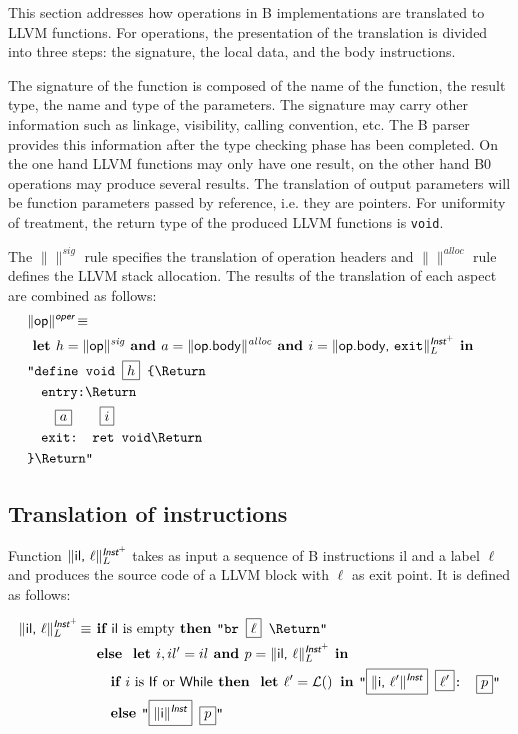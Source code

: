 \documentclass{llncs}
\newcommand{\trad}[2]{\ensuremath{\lVert \textsf{#1} \rVert^{\textit{#2}}}}
\newcommand{\nl}[0]{\text{\Return}}
\DeclareMathOperator{\isdef}{\equiv}
\DeclareMathOperator{\name}{\mathcal{L}()}
\newcommand{\llvm}[1]{\texttt{#1}}
\newcommand{\B}[1]{\textsf{#1}}
\newcommand{\ListOf}[1]{$\mbox{#1}^+$}
\newcommand{\IF}[0]{\textbf{ if }}
\newcommand{\ELSE}[0]{\textbf{ else }}
\newcommand{\THEN}[0]{\textbf{ then }}
\newcommand{\LET}[0]{\textbf{ let }}
\newcommand{\IN}[0]{\textbf{ in }}
\newcommand{\AND}[0]{\textbf{ and }}
\newcommand{\PH}[1]{\framebox{$#1$}}
\begin{document}
This section addresses how operations in B implementations are translated to
LLVM functions. For operations, the presentation of the translation
is divided into three steps: the signature, the local data, and the body
instructions.

The signature of the function is composed of the name of the function, the
result type, the name and type of the parameters. The signature may carry other
information such as linkage, visibility, calling convention, etc. The B parser
provides this information after the type checking phase has been completed.  On
the one hand LLVM functions may only have one result, on the other hand B0
operations may produce several results. The translation of output parameters
will be function parameters passed by reference, i.e. they are pointers. For
uniformity of treatment, the return type of the produced LLVM functions is
\llvm{void}.

The \trad{}{sig} rule specifies the translation of operation headers and
\trad{}{alloc} rule defines the LLVM stack allocation.  The results of the
translation of each aspect are combined as follows:
\begin{align*}
\begin{split}
  \lefteqn{\trad{\B{op}}{\B{oper}} \isdef} \\
  & \LET h = \trad{\B{op}}{sig} \AND   a = \trad{\B{op.body}}{alloc} \AND i = \trad{\B{op.body}, \llvm{exit}}{\ListOf{\B{Inst}}}_L \IN  \\
  & \llvm{"define void \PH{h} \{\nl} \\
  & \quad \llvm{entry:\nl} \\
  & \quad \quad \PH{a}  \quad \quad \PH{i}  \\
  & \quad \llvm{exit: ret void\nl} \\
  & \llvm{\}\nl"}
\end{split}
\end{align*}

\subsection{Translation of instructions}
\label{sec:trad-instr}

Function $\trad{\B{il}, $\ell$}{\ListOf{\B{Inst}}}_L$ takes as input a sequence
of B instructions \B{il} and a label $\ell$ and produces the source code of a
LLVM block with $\ell$ as exit point. It is defined as follows:

\begin{align*}
\trad{\B{il}, $\ell$}{\ListOf{\B{Inst}}}_L \isdef & \IF \B{il} \mbox{ is empty} \THEN \llvm{"br \PH{\ell} \nl"} \\
& \ELSE \LET i, il' = il  \AND p = \trad{il, $\ell$}{\ListOf{\B{Inst}}}_L \IN \\
& \quad \IF i \mbox{ is \B{If} or \B{While}} \THEN \LET \ell' = \name \IN \llvm{"\PH{\trad{i, $\ell'$}{\B{Inst}}} \PH{\ell'}: \PH{p}"} \\
& \quad \ELSE \llvm{"\PH{\trad{i}{\B{Inst}}} \PH{p}"}
\end{align*}
\end{document}
